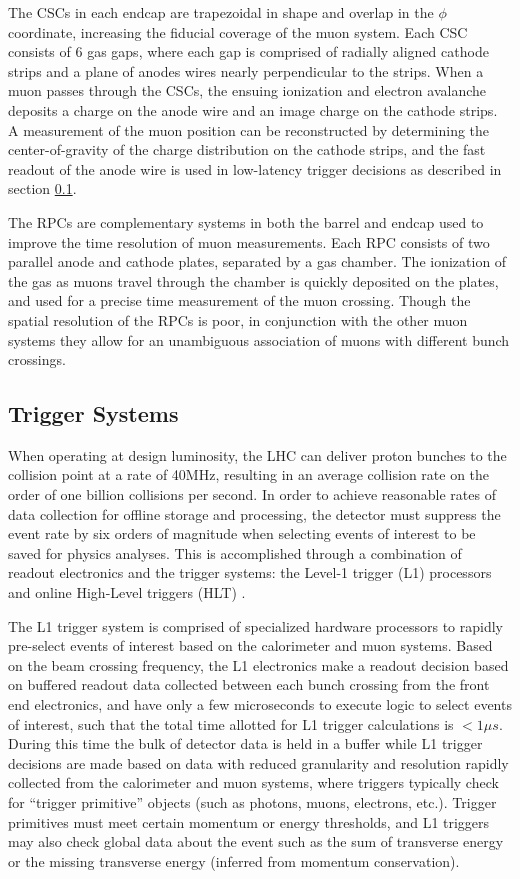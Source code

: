 The CSCs in each endcap are trapezoidal in shape and overlap in the $\phi$ coordinate, increasing the fiducial coverage of the muon system. Each CSC consists of 6 gas gaps, where each gap is comprised of radially aligned cathode strips and a plane of anodes wires nearly perpendicular to the strips. When a muon passes through the CSCs, the ensuing ionization and electron avalanche deposits a charge on the anode wire and an image charge on the cathode strips. A measurement of the muon position can be reconstructed by determining the center-of-gravity of the charge distribution on the cathode strips, and the fast readout of the anode wire is used in low-latency trigger decisions as described in section \ref{subsec:triggers}.

The RPCs are complementary systems in both the barrel and endcap used to improve the time resolution of muon measurements. Each RPC consists of two parallel anode and cathode plates, separated by a gas chamber. The ionization of the gas as muons travel through the chamber is quickly deposited on the plates, and used for a precise time measurement of the muon crossing. Though the spatial resolution of the RPCs is poor, in conjunction with the other muon systems they allow for an unambiguous association of muons with different bunch crossings.
 
\subsection{Trigger Systems}
\label{subsec:triggers}
When operating at design luminosity, the LHC can deliver proton bunches to the collision point at a rate of 40MHz, resulting in an average collision rate on the order of one billion collisions per second. In order to achieve reasonable rates of data collection for offline storage and processing, the detector must suppress the event rate by six orders of magnitude when selecting events of interest to be saved for physics analyses. This is accomplished through a combination of readout electronics and the trigger systems: the Level-1 trigger (L1) processors and online High-Level triggers (HLT) \cite{Lester:1999tx}.

The L1 trigger system is comprised of specialized hardware processors to rapidly pre-select events of interest based on the calorimeter and muon systems. Based on the beam crossing frequency, the L1 electronics make a readout decision based on buffered readout data collected between each bunch crossing from the front end electronics, and have only a few microseconds to execute logic to select events of interest, such that the total time allotted for L1 trigger calculations is $<1\mu s$. During this time the bulk of detector data is held in a buffer while L1 trigger decisions are made based on data with reduced granularity and resolution rapidly collected from the calorimeter and muon systems, where triggers typically check for ``trigger primitive'' objects (such as photons, muons, electrons, etc.). Trigger primitives must meet certain momentum or energy thresholds, and L1 triggers may also check global data about the event such as the sum of transverse energy or the missing transverse energy (inferred from momentum conservation). 

